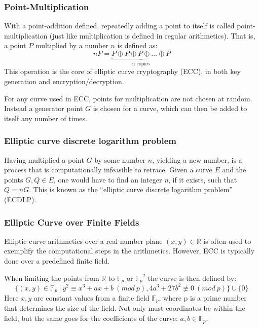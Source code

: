 \subsubsection{Point-Multiplication}
With a point-addition defined, repeatedly adding a point to itself is called point-multiplication (just like multiplication is defined in regular arithmetics). That is, a point $P$ multiplied by a number $n$ is defined as:
$$nP = \underbrace{P\oplus P\oplus P\oplus \ldots \oplus P}_\text{n copies}$$
This operation is the core of elliptic curve cryptography (ECC), in both key generation and encryption/decryption.

For any curve used in ECC, points for multiplication are not chosen at random. Instead a generator point $G$ is chosen for a curve, which can then be added to itself any number of times.

\subsubsection{Elliptic curve discrete logarithm problem}
Having multiplied a point $G$ by some number $n$, yielding a new number, is a process that is computationally infeasible to retrace. Given a curve $E$ and the points $G, Q \in E$, one would have to find an integer \textit{n}, if it exists, such that $Q = nG$. This is known as the “elliptic curve discrete logarithm problem” (ECDLP)\cite{elipticcurve}\cite{logarithmproblem}.


\subsubsection{Elliptic Curve over Finite Fields}
Elliptic curve arithmetics over a real number plane $(x,y) \in \mathbb{R}$ is often used to exemplify the computational steps in the arithmetics. However, ECC is typically done over a predefined finite field.

When limiting the points from $\mathbb{R}$ to ${\mathbb{F}_p}$ or ${\mathbb{F}_p}^2$ the curve is then defined by:
$$\{(x,y) \in \mathbb{F}_{p} ~ | ~ y^2 \equiv x^3 +ax +b ~ (mod ~ p), 4a^3 + 27b^2 \not\equiv 0 ~ (mod ~ p) \} \cup \{0\}$$
Here $x,y$ are constant values from a finite field $\mathbb{F}_{p}$, where p is a prime number that determines the size of the field\cite{elipticcurvefinite}. Not only must coordinates be within the field, but the same goes for the coefficients of the curve: $a,b\in\mathbb{F}_p$.

